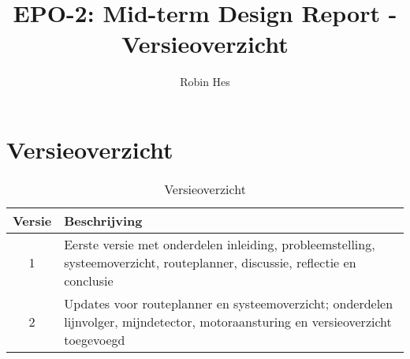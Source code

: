 \documentclass{report}
\title{EPO-2: Mid-term Design Report - Versieoverzicht}
\author{Robin Hes}
\begin{document}
\chapter{Versieoverzicht}
\label{ch:versions}

\begin{table}[H]
	\label{tab:versions}
	\caption{Versieoverzicht}

	\begin{tabular}{|c|p{}|}
		\hline
		\textbf{Versie} & \textbf{Beschrijving} \\
		\hline
		1 & Eerste versie met onderdelen inleiding, probleemstelling, systeemoverzicht, routeplanner, discussie, reflectie en conclusie \\
		\hline
		2 & Updates voor routeplanner en systeemoverzicht; onderdelen lijnvolger, mijndetector, motoraansturing en versieoverzicht toegevoegd \\
		\hline
	\end{tabular}

\end{table}
\end{document}
